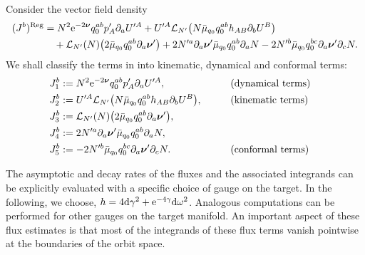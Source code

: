 \documentclass[pdftex]{sigma}
\def\ptl{\partial}%
\def\mbo#1{\boldsymbol{#1}}%
\numberwithin{equation}{section}
\begin{document}
 Consider the vector field density
 \begin{align*}
 	(J^b)^{{\rm Reg}}&{}= N^2 {\rm e}^{-2 \mbo{\nu}} q^{ab}_0 p'_A \ptl_a U'^A + U'^A \mathcal{L}_{N'} \bigl(N \bar{\mu}_{q_0} q^{ab}_0 h_{AB} \ptl_b U^B\bigr) \notag\\
 	&\quad{}+ \mathcal{L}_{N'} (N) \bigl(2 \bar{\mu}_{q_0} q^{ab}_0 \ptl_a \mbo{\nu}'\bigr) + 2 N'^a \ptl_a \mbo{\nu}' \bar{\mu}_{q_0} q^{ab}_0 \ptl_a N
 - 2 N'^b \bar{\mu}_{q_0} q^{bc}_0 \ptl_a \mbo{\nu}' \ptl_c N.
 	\end{align*}
 We shall classify the terms in  into kinematic, dynamical and conformal terms:
 \begin{alignat*}{3}
 	&J_1^b := N^2 {\rm e}^{-2 \mbo{\nu}} q^{ab}_0 p'_A \ptl_a U'^A, \qquad && \text{(dynamical terms)}& \\
 	&J_2^b := U'^A \mathcal{L}_{N'} \bigl(N \bar{\mu}_{q_0} q^{ab}_0 h_{AB} \ptl_b U^B\bigr), \qquad && \text{(kinematic terms)}& \\
 	&J_3^b := \mathcal{L}_{N'} (N) \bigl(2 \bar{\mu}_{q_0} q^{ab}_0 \ptl_a \mbo{\nu}'\bigr), &&& \\
 	&J_4^b := 2 N'^a \ptl_a \mbo{\nu}' \bar{\mu}_{q_0} q^{ab}_0 \ptl_a N, &&&\\
 	&J_5^b := - 2 N'^b \bar{\mu}_{q_0} q^{bc}_0 \ptl_a \mbo{\nu}' \ptl_c N. \qquad && \text{(conformal terms)}
 	\end{alignat*}

The asymptotic and decay rates of the fluxes and the associated integrands can be explicitly evaluated with a specific choice of gauge on the target. In the following, we choose, $h = 4 {\rm d}\gamma ^2 + {\rm e}^{-4 \gamma } {\rm d} \omega^2$. Analogous computations can be performed for other gauges on the target manifold. An important aspect of these flux estimates is that most of the integrands of these flux terms vanish pointwise at the boundaries of the orbit space. %
\end{document}
